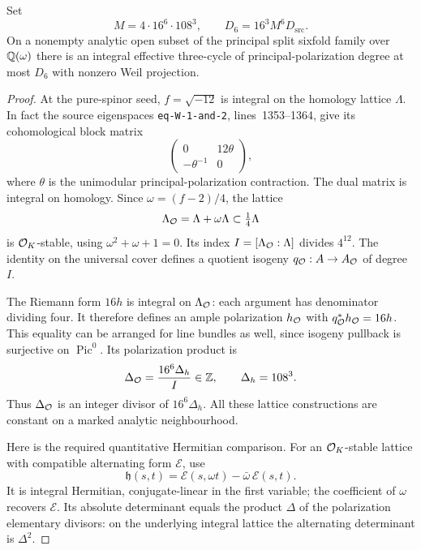 \begin{lemma}\label{M10a}
Set
\[
 M=4\cdot16^6\cdot108^3,\qquad
 D_6=16^3M^6D_{\mathrm{src}}.
\]
On a nonempty analytic open subset of the principal split sixfold
family over $\mathbb Q(\omega)$ there is an integral effective three-cycle
of principal-polarization degree at most $D_6$ with nonzero Weil
projection.
\end{lemma}
\begin{proof}
At the pure-spinor seed, $f=\sqrt{-12}$ is integral on the homology
lattice $\Lambda$. In fact the source eigenspaces
\texttt{eq-W-1-and-2}, lines~1353--1364, give its cohomological
block matrix
\[
 \begin{pmatrix}0&12\theta\\-\theta^{-1}&0\end{pmatrix},
\]
where $\theta$ is the unimodular principal-polarization contraction.
The dual matrix is integral on homology. Since
$\omega=(f-2)/4$, the lattice
\[
 \Lambda_{\mathcal O}=\Lambda+\omega\Lambda
 \subset\tfrac14\Lambda
\]
is $\mathcal O_K$-stable, using $\omega^2+\omega+1=0$.
Its index $I=[\Lambda_{\mathcal O}:\Lambda]$ divides $4^{12}$.
The identity on the universal cover defines a quotient isogeny
$q_{\mathcal O}:A\to A_{\mathcal O}$ of degree $I$.

The Riemann form $16h$ is integral on $\Lambda_{\mathcal O}$: each argument
has denominator dividing four. It therefore defines an ample
polarization $h_{\mathcal O}$ with
$q_{\mathcal O}^*h_{\mathcal O}=16h$. This equality can be arranged for line
bundles as well, since isogeny pullback is surjective on
$\operatorname{Pic}^0$. Its polarization product is
\[
 \Delta_{\mathcal O}=\frac{16^6\Delta_h}{I}\in\mathbb Z,
 \qquad \Delta_h=108^3.
\]
Thus $\Delta_{\mathcal O}$ is an integer divisor of $16^6\Delta_h$.
All these lattice constructions are constant on a marked analytic
neighbourhood.

Here is the required quantitative Hermitian comparison.
For an $\mathcal O_K$-stable lattice with compatible alternating form
$\mathcal E$, use
\[
 \mathfrak h(s,t)=\mathcal E(s,\omega t)
                         -\bar\omega\,\mathcal E(s,t).
\]
It is integral Hermitian, conjugate-linear in the first variable;
the coefficient of $\omega$ recovers $\mathcal E$.
Its absolute determinant equals the product $\Delta$ of the
polarization elementary divisors: on the underlying integral lattice
the alternating determinant is $\Delta^2$.


\end{proof}
